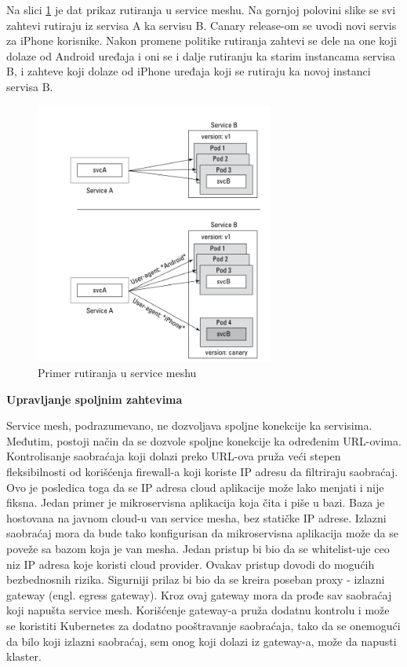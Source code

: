 \documentclass[a4paper,12pt]{report}
\begin{document}
Na slici \ref{fig:routing-example} je dat prikaz rutiranja u service meshu. Na gornjoj polovini slike se svi zahtevi rutiraju iz servisa A ka servisu B. Canary release-om se uvodi novi servis za iPhone korisnike. Nakon promene politike rutiranja zahtevi se dele na one koji dolaze od Android uređaja i oni se i dalje rutiranju ka starim instancama servisa B, i zahteve koji dolaze od iPhone uređaja koji se rutiraju ka novoj instanci servisa B. \newline

\begin{figure}[h]
    \centering
    \includegraphics[width=0.7\textwidth]{routing_example}
    \caption{Primer rutiranja u service meshu}
    \label{fig:routing-example}
\end{figure} 

\textbf{Upravljanje spoljnim zahtevima}\newline

Service mesh, podrazumevano, ne dozvoljava spoljne konekcije ka servisima. Međutim, postoji način da se dozvole spoljne konekcije ka određenim URL-ovima. Kontrolisanje saobraćaja koji dolazi preko URL-ova pruža veći stepen fleksibilnosti od korišćenja firewall-a koji koriste IP adresu da filtriraju saobraćaj. Ovo je posledica toga da se IP adresa cloud aplikacije može lako menjati i nije fiksna. Jedan primer je mikroservisna aplikacija koja čita i piše u bazi. Baza je hostovana na javnom cloud-u van service mesha, bez statičke IP adrese. Izlazni saobraćaj mora da bude tako konfigurisan da mikroservisna aplikacija može da se poveže sa bazom koja je van mesha. Jedan pristup bi bio da se whitelist-uje ceo niz IP adresa koje koristi cloud provider. Ovakav pristup dovodi do mogućih bezbednosnih rizika. Sigurniji prilaz bi bio da se kreira poseban proxy - izlazni gateway (engl. egress gateway). Kroz ovaj gateway mora da prođe sav saobraćaj koji napušta service mesh. Korišćenje gateway-a pruža dodatnu kontrolu i može se koristiti Kubernetes za dodatno pooštravanje saobraćaja, tako da se onemogući da bilo koji izlazni saobraćaj, sem onog koji dolazi iz gateway-a, može da napusti klaster. \newline
\end{document}
